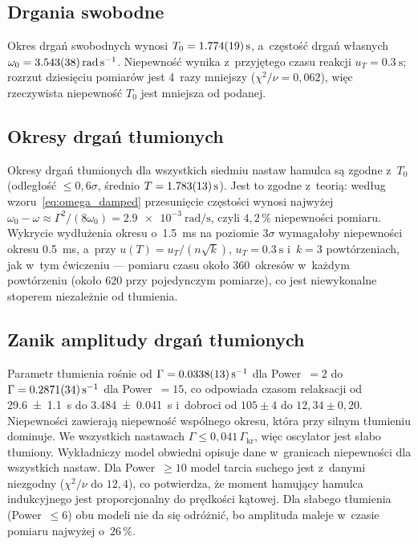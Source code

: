 \documentclass[12pt, a4paper]{article}
\begin{document}
\subsection{Drgania swobodne}

Okres drgań swobodnych wynosi $T_0 = \SI{1.774 \pm 0.019}{\second}$, a~częstość drgań
własnych $\omega_0 = \SI{3.543 \pm 0.038}{\radian\per\second}$. Niepewność wynika
z~przyjętego czasu reakcji $u_T = \SI{0.3}{\second}$; rozrzut dziesięciu pomiarów
jest 4~razy mniejszy ($\chi^2/\nu = 0{,}062$), więc rzeczywista niepewność $T_0$
jest mniejsza od podanej.

\subsection{Okresy drgań tłumionych}

Okresy drgań tłumionych dla wszystkich siedmiu nastaw hamulca są zgodne z~$T_0$
(odległość $\leq 0{,}6\sigma$, średnio $T = \SI{1.783 \pm 0.013}{\second}$). Jest to
zgodne z~teorią: według wzoru~\eqref{eq:omega_damped} przesunięcie częstości wynosi
najwyżej $\omega_0 - \omega \approx \Gamma^2/(8\omega_0) = \SI{2.9e-3}{\radian\per\second}$,
czyli $4{,}2\,\%$ niepewności pomiaru. Wykrycie wydłużenia okresu o~\SI{1.5}{\milli\second}
na poziomie $3\sigma$ wymagałoby niepewności okresu \SI{0.5}{\milli\second}, a~przy
$u(T) = u_T/(n\sqrt{k})$, $u_T = \SI{0.3}{\second}$ i~$k = 3$ powtórzeniach, jak
w~tym ćwiczeniu --- pomiaru czasu około $360$~okresów w~każdym powtórzeniu
(około $620$ przy pojedynczym pomiarze), co jest niewykonalne stoperem niezależnie
od tłumienia.

\subsection{Zanik amplitudy drgań tłumionych}

Parametr tłumienia rośnie od $\Gamma = \SI{0.0338 \pm 0.0013}{\per\second}$ dla
Power~$=2$ do $\Gamma = \SI{0.2871 \pm 0.0034}{\per\second}$ dla Power~$=15$, co
odpowiada czasom relaksacji od \SI{29.6 \pm 1.1}{\second} do \SI{3.484 \pm 0.041}{\second}
i~dobroci od $105 \pm 4$ do $12{,}34 \pm 0{,}20$. Niepewności zawierają niepewność
wspólnego okresu, która przy silnym tłumieniu dominuje. We wszystkich nastawach
$\Gamma \leq 0{,}041\,\Gamma_\text{kr}$, więc oscylator jest słabo tłumiony.
Wykładniczy model obwiedni opisuje dane w~granicach niepewności dla wszystkich nastaw.
Dla Power~$\geq 10$ model tarcia suchego jest z~danymi niezgodny ($\chi^2/\nu$ do
$12{,}4$), co potwierdza, że moment hamujący hamulca indukcyjnego jest proporcjonalny
do prędkości kątowej. Dla słabego tłumienia (Power~$\leq 6$) obu modeli nie da się
odróżnić, bo amplituda maleje w~czasie pomiaru najwyżej o~$26\,\%$.
\end{document}
